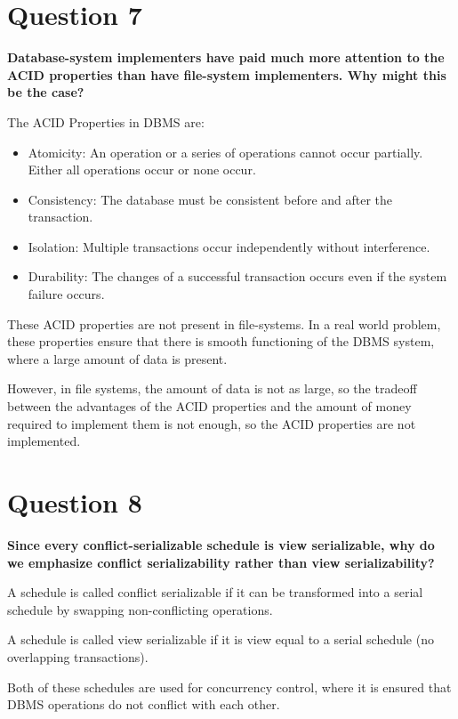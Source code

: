\documentclass[12pt]{article}
\begin{document}
\section*{Question 7}
{\bfseries Database-system implementers have paid much more attention to the ACID properties than have file-system implementers. Why might this be the case?}

The ACID Properties in DBMS are:
\begin{itemize}
\item Atomicity: An operation or a series of operations cannot occur partially. Either all operations occur or none occur.

\item Consistency: The database must be consistent before and after the transaction.

\item Isolation: Multiple transactions occur independently without interference.

\item Durability: The changes of a successful transaction occurs even if the system failure occurs.
\end{itemize}
These ACID properties are not present in file-systems. In a real world problem, these properties ensure that there is smooth functioning of the DBMS system, where a large amount of data is present.

However, in file systems, the amount of data is not as large, so the tradeoff between the advantages of the ACID properties and the amount of money required to implement them is not enough, so the ACID properties are not implemented.

\section*{Question 8}
{\bfseries Since every conflict-serializable schedule is view serializable, why do we emphasize conflict serializability rather than view serializability?}

A schedule is called conflict serializable if it can be transformed into a serial schedule by swapping non-conflicting operations.

A schedule is called view serializable if it is view equal to a serial schedule (no overlapping transactions).
 
Both of these schedules are used for concurrency control, where it is ensured that DBMS operations do not conflict with each other.
\end{document}
